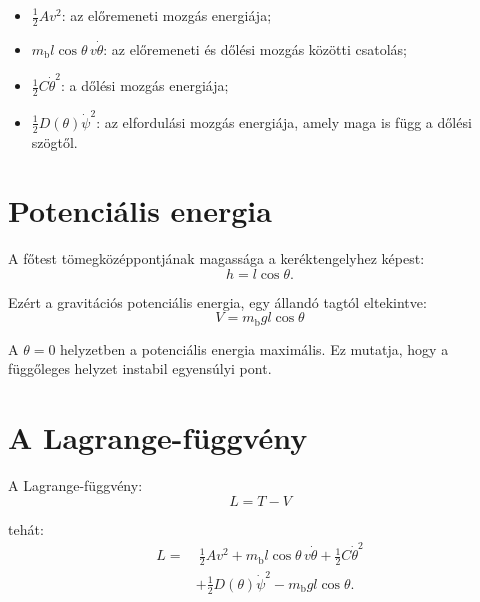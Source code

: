 \documentclass[12pt,a4paper]{article}
\newcommand{\mbody}{m_{\mathrm{b}}}
\begin{document}
	\begin{itemize}[leftmargin=2em]
		\item $\tfrac12 Av^2$: az előremeneti mozgás energiája;
		\item $\mbody l\cos\theta\,v\dot\theta$: az előremeneti és dőlési mozgás közötti csatolás;
		\item $\tfrac12 C\dot\theta^2$: a dőlési mozgás energiája;
		\item $\tfrac12 D(\theta)\dot\psi^2$: az elfordulási mozgás energiája, amely maga is függ a dőlési szögtől.
	\end{itemize}
	
	\section{Potenciális energia}
	
	A főtest tömegközéppontjának magassága a keréktengelyhez képest:
	\begin{equation}
		h=l\cos\theta.
	\end{equation}
	
	Ezért a gravitációs potenciális energia, egy állandó tagtól eltekintve:
	\begin{equation}
		\boxed{
			V=\mbody g l\cos\theta
		}
	\end{equation}
	
	A $\theta=0$ helyzetben a potenciális energia maximális. Ez mutatja, hogy a függőleges helyzet instabil egyensúlyi pont.
	
	\section{A Lagrange-függvény}
	
	A Lagrange-függvény:
	\begin{equation}
		\boxed{
			L=T-V
		}
	\end{equation}
	
	tehát:
	\begin{equation}
		\begin{aligned}
			L=&\ \frac{1}{2}Av^2
			+\mbody l\cos\theta\,v\dot\theta
			+\frac{1}{2}C\dot\theta^2\\
			&+\frac{1}{2}D(\theta)\dot\psi^2
			-\mbody g l\cos\theta.
		\end{aligned}
	\end{equation}
	
\end{document}
